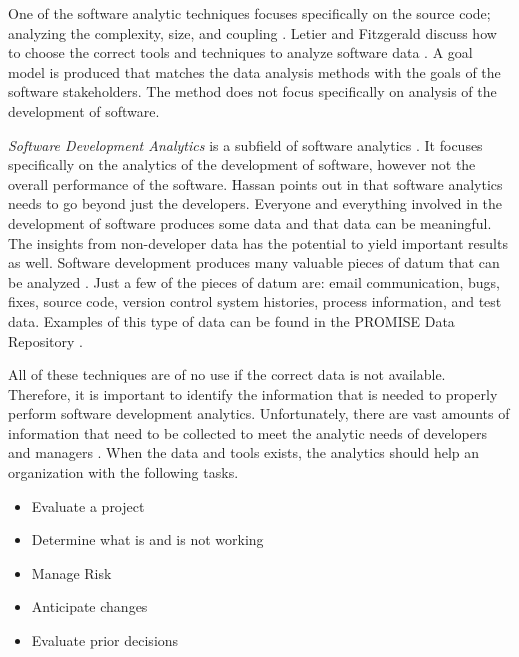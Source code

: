 \documentclass[SDSUThesis.tex]{subfiles}
\begin{document}
    One of the software analytic techniques focuses specifically 
    on the source code; analyzing the 
    complexity, size, and coupling \cite{Tosi2012}. 
    Letier and Fitzgerald discuss how to choose the 
    correct tools and techniques to analyze
    software data \cite{Letier2013}.  A goal model is 
    produced that matches the data analysis methods
    with the goals of the software stakeholders. The method does not focus
    specifically on analysis of the development of software.
    
    \textit{Software Development Analytics} is a subfield of 
    software analytics \cite{Menzies2012}.  It focuses
    specifically on the 
    analytics of the development of software, however not
    the overall performance of the software.  Hassan points out
    in \cite{Hassan2013} that software analytics needs to go beyond
    just the developers.  Everyone and everything involved in the 
    development of software produces some data and that data can be meaningful.
    The insights from non-developer data has the potential to yield important
    results as well. 
    Software development produces many valuable pieces of datum that can be analyzed
    \cite{Marcus2010}. Just a few of the pieces of datum are:
    email communication, bugs, fixes, source code, version control system histories,
    process information, and test data.  Examples of this type of data
    can be found in the PROMISE Data Repository \cite{promise12}.
    
    All of these techniques are of no use if the correct data
    is not available.  Therefore, it is important to 
    identify the information that is needed to properly 
    perform software development analytics.
    Unfortunately, there are vast amounts of information that 
    need to be collected to meet the analytic needs of 
    developers and managers \cite{Buse2012}.  When the
    data and tools exists, the analytics should help an
    organization with the following tasks.
    \begin{itemize}
        \item Evaluate a project
        \item Determine what is and is not working
        \item Manage Risk
        \item Anticipate changes
        \item Evaluate prior decisions
    \end{itemize}
    
\end{document}
